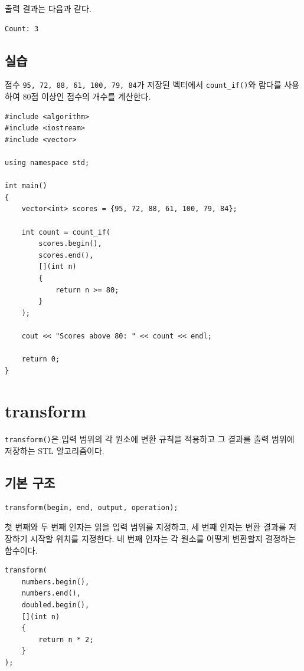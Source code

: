 \documentclass[11pt,a4paper]{article}
\begin{document}
출력 결과는 다음과 같다.

\begin{verbatim}
Count: 3
\end{verbatim}

\subsection{실습}
\begin{practicebox}
점수 \texttt{95, 72, 88, 61, 100, 79, 84}가 저장된 벡터에서
\texttt{count\_if()}와 람다를 사용하여 80점 이상인 점수의 개수를 계산한다.
\end{practicebox}

\begin{lstlisting}
#include <algorithm>
#include <iostream>
#include <vector>

using namespace std;

int main()
{
    vector<int> scores = {95, 72, 88, 61, 100, 79, 84};

    int count = count_if(
        scores.begin(),
        scores.end(),
        [](int n)
        {
            return n >= 80;
        }
    );

    cout << "Scores above 80: " << count << endl;

    return 0;
}
\end{lstlisting}

\section{transform}
\texttt{transform()}은 입력 범위의 각 원소에 변환 규칙을 적용하고 그 결과를 출력 범위에 저장하는 STL 알고리즘이다.

\subsection{기본 구조}
\begin{lstlisting}
transform(begin, end, output, operation);
\end{lstlisting}

첫 번째와 두 번째 인자는 읽을 입력 범위를 지정하고,
세 번째 인자는 변환 결과를 저장하기 시작할 위치를 지정한다.
네 번째 인자는 각 원소를 어떻게 변환할지 결정하는 함수이다.

\begin{lstlisting}
transform(
    numbers.begin(),
    numbers.end(),
    doubled.begin(),
    [](int n)
    {
        return n * 2;
    }
);
\end{lstlisting}
\end{document}
